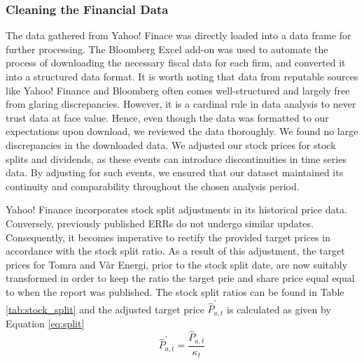 \subsubsection{Cleaning the Financial Data}
The data gathered from Yahoo! Finace was directly loaded into a data frame for further processing. The Bloomberg Excel add-on was used to automate the process of downloading the necessary fiscal data for each firm, and converted it into a structured data format. It is worth noting that data from reputable sources like Yahoo! Finance and Bloomberg often comes well-structured and largely free from glaring discrepancies. However, it is a cardinal rule in data analysis to never trust data at face value. Hence, even though the data was formatted to our expectations upon download, we reviewed the data thoroughly. We found no large discrepancies in the downloaded data. We adjusted our stock prices for stock splits and dividends, as these events can introduce discontinuities in time series data. By adjusting for such events, we ensured that our dataset maintained its continuity and comparability throughout the chosen analysis period. 
\begin{table}[H]
    \centering
    \small
    \caption{Stock Split Information}
    \label{tab:stock_split}
\end{table}
Yahoo! Finance incorporates stock split adjustments in its historical price data. Conversely, previously published ERRs do not undergo similar updates. Consequently, it becomes imperative to rectify the provided target prices in accordance with the stock split ratio. As a result of this adjustment, the target prices for Tomra and Vår Energi, prior to the stock split date, are now suitably transformed in order to keep the ratio the target prie and share price equal equal to when the report was published. The stock split ratios can be found in Table \ref{tab:stock_split} and the adjusted target price \(\hat{P}_{a,t}^{'}\) is calculated as given by Equation \ref{eq:split}
\begin{equation} \label{eq:split}
    \hat{P}_{a,t}^{'}=\frac{\hat{P}_{a,t}}{\kappa_t}
\end{equation}


